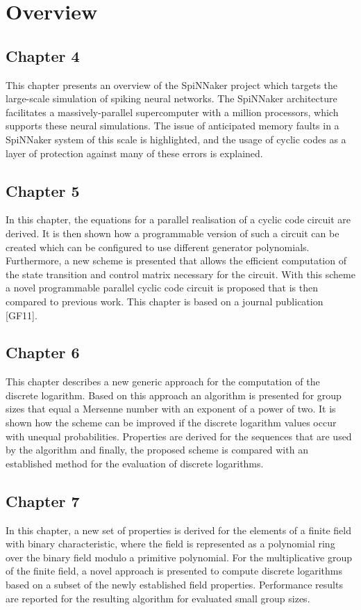 \documentclass[oneside, a4paper, 11pt]{memoir}
\begin{document}
\section{Overview}
\subsection{Chapter 4}
This chapter presents an overview of the SpiNNaker project which targets the large-scale simulation of spiking neural networks. The SpiNNaker architecture facilitates a massively-parallel supercomputer with a million processors, which supports these neural simulations. The issue of anticipated memory faults in a SpiNNaker system of this scale is highlighted, and the usage of cyclic codes as a layer of protection against many of these errors is explained.

\subsection{Chapter 5}
In this chapter, the equations for a parallel realisation of a cyclic code circuit are derived. It is then shown how a programmable version of such a circuit can be created which can be configured to use different generator polynomials. Furthermore, a new scheme is presented that allows the efficient computation of the state transition and control matrix necessary for the circuit. With this scheme a novel programmable parallel cyclic code circuit is proposed that is then compared to previous work. This chapter is based on a journal publication [GF11].

\subsection{Chapter 6}
This chapter describes a new generic approach for the computation of the discrete logarithm. Based on this approach an algorithm is presented for group sizes that equal a Mersenne number with an exponent of a power of two. It is shown how the scheme can be improved if the discrete logarithm values occur with unequal probabilities. Properties are derived for the sequences that are used by the algorithm and finally, the proposed scheme is compared with an established method for the evaluation of discrete logarithms.

\subsection{Chapter 7}
In this chapter, a new set of properties is derived for the elements of a finite field with binary characteristic, where the field is represented as a polynomial ring over the binary field modulo a primitive polynomial. For the multiplicative group of the finite field, a novel approach is presented to compute discrete logarithms based on a subset of the newly established field properties. Performance results are reported for the resulting algorithm for evaluated small group sizes.
\end{document}
